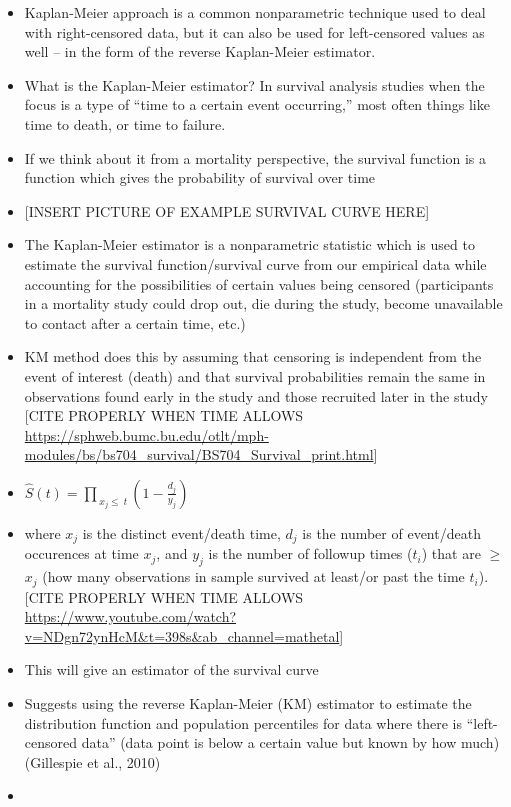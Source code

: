 \documentclass[12pt, twoside]{amherstthesis}
\begin{document}
\begin{itemize}
\item
  Kaplan-Meier approach is a common nonparametric technique used to deal with right-censored data, but it can also be used for left-censored values as well -- in the form of the reverse Kaplan-Meier estimator.
\item
  What is the Kaplan-Meier estimator? In survival analysis studies when the focus is a type of ``time to a certain event occurring,'' most often things like time to death, or time to failure.
\item
  If we think about it from a mortality perspective, the survival function is a function which gives the probability of survival over time
\item
  {[}INSERT PICTURE OF EXAMPLE SURVIVAL CURVE HERE{]}
\item
  The Kaplan-Meier estimator is a nonparametric statistic which is used to estimate the survival function/survival curve from our empirical data while accounting for the possibilities of certain values being censored (participants in a mortality study could drop out, die during the study, become unavailable to contact after a certain time, etc.)
\item
  KM method does this by assuming that censoring is independent from the event of interest (death) and that survival probabilities remain the same in observations found early in the study and those recruited later in the study {[}CITE PROPERLY WHEN TIME ALLOWS \url{https://sphweb.bumc.bu.edu/otlt/mph-modules/bs/bs704_survival/BS704_Survival_print.html}{]}
\item
  \(\hat{S}(t) = \prod_{\ x_j \le \ t }(1-\frac{d_j}{y_j})\)
\item
  where \(x_j\) is the distinct event/death time, \(d_j\) is the number of event/death occurences at time \(x_j\), and \(y_j\) is the number of followup times (\(t_i\)) that are \(\ge\) \(x_j\) (how many observations in sample survived at least/or past the time \(t_i\)). {[}CITE PROPERLY WHEN TIME ALLOWS \url{https://www.youtube.com/watch?v=NDgn72ynHcM\&t=398s\&ab_channel=mathetal}{]}
\item
  This will give an estimator of the survival curve
\item
  Suggests using the reverse Kaplan-Meier (KM) estimator to estimate the distribution function and population percentiles for data where there is ``left-censored data'' (data point is below a certain value but known by how much) (Gillespie et al., 2010)
\item

\end{itemize}
\end{document}
